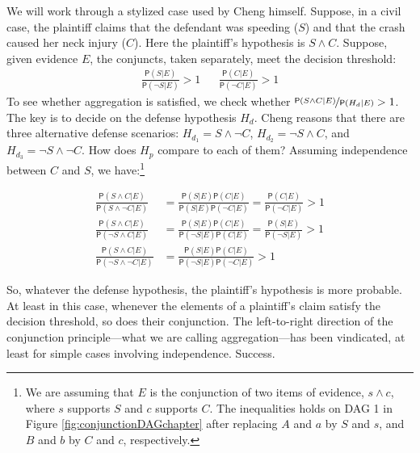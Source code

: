 \documentclass[
  10pt,
  dvipsnames,enabledeprecatedfontcommands]{scrartcl}
\newcommand{\n}{\neg}
\newcommand{\et}{\wedge}
\newcommand{\pr}[1]{\ensuremath{\mathsf{P}(#1)}}
\begin{document}
We will work through a stylized case used by Cheng himself. Suppose, in
a civil case, the plaintiff claims that the defendant was speeding
(\(S\)) and that the crash caused her neck injury (\(C\)). Here the
plaintiff's hypothesis is \(S\et C\). Suppose, given evidence \(E\), the
conjuncts, taken separately, meet the decision threshold: \begin{align}
 \nonumber 
 \frac{\pr{S\vert E}}{\pr{\neg S \vert E}} > 1   & & \frac{\pr{C\vert E}}{\pr{\neg C \vert E}} > 1
\end{align} \noindent To see whether aggregation is satisfied, we check
whether \(\nicefrac{\pr{S\et C\vert E}}{\pr{H_d \vert E}}>1\). The key
is to decide on the defense hypothesis \(H_d\). Cheng reasons that there
are three alternative defense scenarios: \(H_{d_1}= S\et \n C\),
\(H_{d_2}=\n S \et C\), and \(H_{d_3}=\n S \et \n C\). How does \(H_p\)
compare to each of them? Assuming independence between \(C\) and \(S\),
we have:\footnote{We are assuming that \(E\) is the conjunction of two
  items of evidence, \(s\et c\), where \(s\) supports \(S\) and \(c\)
  supports \(C\). The inequalities holds on \textsf{DAG 1} in Figure
  \ref{fig:conjunctionDAGchapter} after replacing \(A\) and \(a\) by
  \(S\) and \(s\), and \(B\) and \(b\) by \(C\) and \(c\), respectively.}

\begin{align}\label{eq:cheng-multiplication}
\frac{\pr{S\et C\vert E}}{\pr{S\et \n C\vert E}} & = \frac{\pr{S\vert E}\pr{C\vert E}}{\pr{S \vert E}\pr{\n C \vert E}}  =\frac{\pr{C\vert E}}{\pr{\n C \vert E}} > 1 \\
\nonumber
\frac{\pr{S\et C\vert E}}{\pr{\n S\et C\vert E}} & = \frac{\pr{S\vert E}\pr{C\vert E}}{\pr{\n S \vert E}\pr{C\vert E}}  = \frac{\pr{S\vert E}}{\pr{\n S \vert E}} > 1 \\
\nonumber
\frac{\pr{S\et C\vert E}}{\pr{\n S\et \n C\vert E}} & = \frac{\pr{S\vert E}\pr{C\vert E}}{\pr{\n S \vert E}\pr{\n C \vert E}}   > 1 
\end{align}

\noindent So, whatever the defense hypothesis, the plaintiff's
hypothesis is more probable. At least in this case, whenever the
elements of a plaintiff's claim satisfy the decision threshold, so does
their conjunction. The left-to-right direction of the conjunction
principle---what we are calling aggregation---has been vindicated, at
least for simple cases involving independence. Success.
\end{document}
